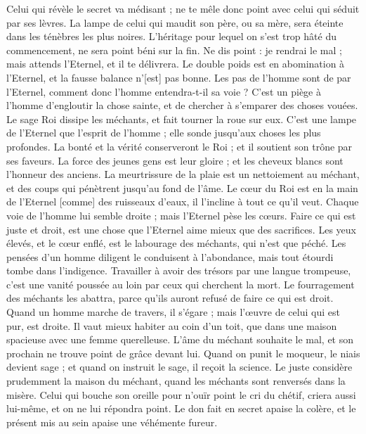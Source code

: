 \begin{multicols}{2}
Celui qui révèle le secret va médisant ; ne te mêle donc point avec celui qui séduit par ses lèvres.
La lampe de celui qui maudit son père, ou sa mère, sera éteinte dans les ténèbres les plus noires.
L'héritage pour lequel on s'est trop hâté du commencement, ne sera point béni sur la fin.
Ne dis point : je rendrai le mal ; mais attends l'Eternel, et il te délivrera.
Le double poids est en abomination à l'Eternel, et la fausse balance n'[est] pas bonne.
Les pas de l'homme sont de par l'Eternel, comment donc l'homme entendra-t-il sa voie ?
C'est un piège à l'homme d'engloutir la chose sainte, et de chercher à s'emparer des choses vouées.
Le sage Roi dissipe les méchants, et fait tourner la roue sur eux.
C'est une lampe de l'Eternel que l'esprit de l'homme ; elle sonde jusqu'aux choses les plus profondes.
La bonté et la vérité conserveront le Roi ; et il soutient son trône par ses faveurs.
La force des jeunes gens est leur gloire ; et les cheveux blancs sont l'honneur des anciens.
La meurtrissure de la plaie est un nettoiement au méchant, et des coups qui pénètrent jusqu'au fond de l'âme.
\VerseOne{}Le cœur du Roi est en la main de l'Eternel [comme] des ruisseaux d'eaux, il l'incline à tout ce qu'il veut.
Chaque voie de l'homme lui semble droite ; mais l'Eternel pèse les cœurs.
Faire ce qui est juste et droit, est une chose que l'Eternel aime mieux que des sacrifices.
Les yeux élevés, et le cœur enflé, est le labourage des méchants, qui n'est que péché.
Les pensées d'un homme diligent le conduisent à l'abondance, mais tout étourdi tombe dans l'indigence.
Travailler à avoir des trésors par une langue trompeuse, c'est une vanité poussée au loin par ceux qui cherchent la mort.
Le fourragement des méchants les abattra, parce qu'ils auront refusé de faire ce qui est droit.
Quand un homme marche de travers, il s'égare ; mais l'œuvre de celui qui est pur, est droite.
Il vaut mieux habiter au coin d'un toit, que dans une maison spacieuse avec une femme querelleuse.
L'âme du méchant souhaite le mal, et son prochain ne trouve point de grâce devant lui.
Quand on punit le moqueur, le niais devient sage ; et quand on instruit le sage, il reçoit la science.
Le juste considère prudemment la maison du méchant, quand les méchants sont renversés dans la misère.
Celui qui bouche son oreille pour n'ouïr point le cri du chétif, criera aussi lui-même, et on ne lui répondra point.
Le don fait en secret apaise la colère, et le présent mis au sein apaise une véhémente fureur.

\end{multicols}

